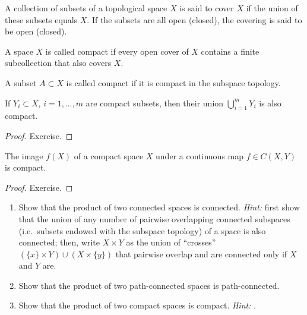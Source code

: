 \documentclass[english,letterpaper]{article}%
\numberwithin{equation}{section}
\numberwithin{figure}{section}
\numberwithin{table}{section}
\theoremstyle{definition}
\theoremstyle{definition}
\theoremstyle{definition}
\theoremstyle{plain}
\theoremstyle{plain}
\theoremstyle{plain}
\theoremstyle{plain}
\theoremstyle{remark}
\theoremstyle{remark}
\newcommand{\PRLsep}{   %
           \noindent\makebox[\linewidth]{
                \resizebox{0.5\linewidth}{1pt}{$\blacklozenge$}}}
\begin{document}
\begin{defn}[Covering]
A collection of subsets of a topological space $X$ is said to cover $X$ if the union of these subsets equals $X$. If the subsets are all open (closed), the covering is said to be open (closed).
\end{defn}

\PRLsep

\begin{defn}
A space $X$ is called compact if every open cover of $X$ contains a finite subcollection that also covers $X$.
\end{defn}

\begin{defn}
A subset $A\subset X$ is called compact if it is compact in the subspace topology.
\end{defn}

\begin{prop}
If $Y_i\subset X$, $i = 1,\dots, m$ are compact subsets, then their union $\bigcup_{i=1}^m Y_i$ is also compact.
\end{prop}
\begin{proof}
Exercise.
\end{proof}

\begin{thm}
The image $f(X)$ of a compact space $X$ under a continuous map $f\in C(X,Y)$ is compact.
\end{thm}
\begin{proof}
Exercise.
\end{proof}

\begin{xca}
\begin{enumerate}
    \item Show that the product of two connected spaces is connected. \emph{Hint:} first show that the union of any number of pairwise overlapping connected subspaces (i.e.\ subsets endowed with the subspace topology) of a space is also connected; then, write $X\times Y$ as the union of ``crosses'' $(\{x\}\times Y)\cup (X\times \{y\})$ that pairwise overlap and are connected only if $X$ and $Y$ are.
    \item Show that the product of two path-connected spaces is path-connected.
    \item Show that the product of two compact spaces is compact. \emph{Hint:} \cite{compact.proof}.
\end{enumerate}
\end{xca}
\end{document}
